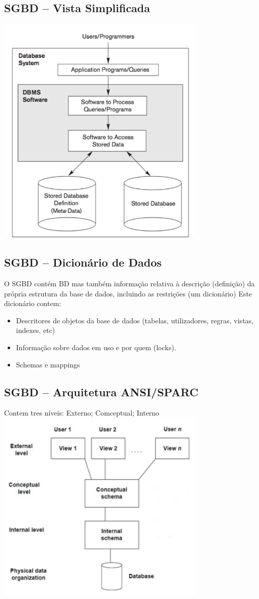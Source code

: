 \documentclass{easyclass}
\begin{document}
\subsection{SGBD – Vista Simplificada}
    \includegraphics[width=10cm]{figures/1.png}

\subsection{SGBD – Dicionário de Dados}
O SGBD contém BD mas também informação relativa à descrição (definição) da própria estrutura da base de dados, incluindo as restrições (um dicionário)
Este dicionário contem:
\begin{itemize}
    \item Descritores de objetos da base de dados (tabelas, utilizadores, regras, vistas, indexes, etc)
    \item Informação sobre dados em uso e por quem (locks).
    \item Schemas e mappings
\end{itemize}
\subsection{SGBD – Arquitetura ANSI/SPARC}
Contem tres níveis: Externo; Comceptual; Interno
\includegraphics[width=10cm]{figures/2.png}
\end{document}
